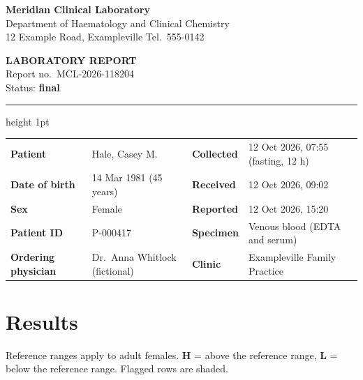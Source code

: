 \documentclass[9.5pt,a4paper]{extarticle}
\begin{document}
\noindent
\begin{minipage}[c]{0.12\linewidth}
\end{minipage}\hfill
\begin{minipage}[c]{0.60\linewidth}
{\LARGE\bfseries\color{lab} Meridian Clinical Laboratory}\\
{\small Department of Haematology and Clinical Chemistry\\ 12 Example Road, Exampleville \textperiodcentered{} Tel.\ 555-0142}
\end{minipage}\hfill
\begin{minipage}[c]{0.24\linewidth}
\raggedleft\small
\textbf{LABORATORY REPORT}\\
Report no.\ MCL-2026-118204\\
Status: \textbf{final}
\end{minipage}

\vspace{0.3em}\hrule height 1pt\vspace{0.6em}

\begin{tabularx}{\linewidth}{@{}>{\bfseries}l X >{\bfseries}l X@{}}
  Patient & Hale, Casey M. & Collected & 12 Oct 2026, 07:55 (fasting, 12 h) \\
  Date of birth & 14 Mar 1981 (45 years) & Received & 12 Oct 2026, 09:02 \\
  Sex & Female & Reported & 12 Oct 2026, 15:20 \\
  Patient ID & P-000417 & Specimen & Venous blood (EDTA and serum) \\
  Ordering physician & Dr.\ Anna Whitlock (fictional) & Clinic & Exampleville Family Practice \\
\end{tabularx}

\vspace{0.4em}
\section*{\normalsize\color{lab} Results}
{\small Reference ranges apply to adult females. \textbf{H} = above the reference range, \textbf{L} = below the
reference range. Flagged rows are shaded.}
\end{document}
